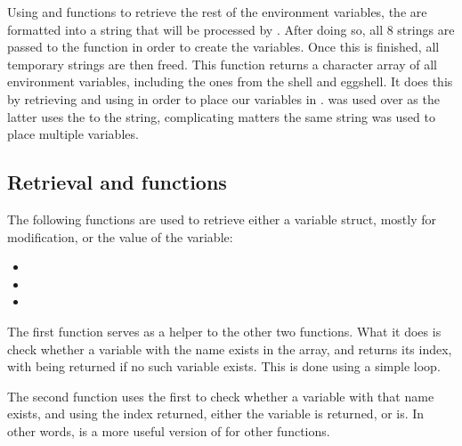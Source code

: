 \documentclass[12pt, a4paper]{report}
\begin{document}
                Using  and functions to retrieve the rest of the environment 
                variables, the   are formatted into a string
                that will be processed by . After doing so, all 8 strings
                are passed to the function in order to create the variables. Once this
                is finished, all temporary strings are then freed.
                This function returns a character array of all environment variables,
                including the ones from the shell and eggshell. It does this by 
                retrieving  and using  in order
                to place our variables in .  was used over
                 as the latter uses the  to the string, 
                complicating matters the same string was used to place multiple
                variables.
                \clearpage
            \subsection{Retrieval and  functions}
                The following functions are used to retrieve either a variable struct,
                mostly for modification, or the value of the variable:

                \begin{itemize}
                    \item {}
                    \item {}
                    \item {}
                \end{itemize}

                The first function serves as a helper to the other two functions.
                What it does is check whether a variable with the name 
                exists in the array, and returns its index, with  being returned
                if no such variable exists. This is done using a simple loop.

                The second function uses the first to check whether a variable with
                that name exists, and using the index returned, either the variable 
                is returned, or  is. In other words,  is a 
                more useful version of  for other functions.
\end{document}

